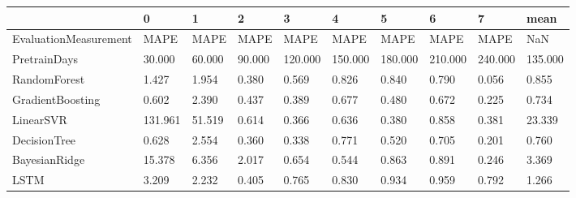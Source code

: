 \begin{tabular}{llllllllll}
\toprule
{} &       0 &      1 &      2 &       3 &       4 &       5 &       6 &       7 &    mean \\
\midrule
EvaluationMeasurement &    MAPE &   MAPE &   MAPE &    MAPE &    MAPE &    MAPE &    MAPE &    MAPE &     NaN \\
PretrainDays          &  30.000 & 60.000 & 90.000 & 120.000 & 150.000 & 180.000 & 210.000 & 240.000 & 135.000 \\
RandomForest          &   1.427 &  1.954 &  0.380 &   0.569 &   0.826 &   0.840 &   0.790 &   0.056 &   0.855 \\
GradientBoosting      &   0.602 &  2.390 &  0.437 &   0.389 &   0.677 &   0.480 &   0.672 &   0.225 &   0.734 \\
LinearSVR             & 131.961 & 51.519 &  0.614 &   0.366 &   0.636 &   0.380 &   0.858 &   0.381 &  23.339 \\
DecisionTree          &   0.628 &  2.554 &  0.360 &   0.338 &   0.771 &   0.520 &   0.705 &   0.201 &   0.760 \\
BayesianRidge         &  15.378 &  6.356 &  2.017 &   0.654 &   0.544 &   0.863 &   0.891 &   0.246 &   3.369 \\
LSTM                  &   3.209 &  2.232 &  0.405 &   0.765 &   0.830 &   0.934 &   0.959 &   0.792 &   1.266 \\
\bottomrule
\end{tabular}
